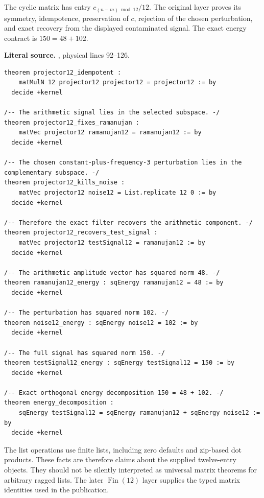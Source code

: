 The cyclic matrix has entry \(c_{(n-m)\bmod12}/12\). The original layer proves
its symmetry, idempotence, preservation of \(c\), rejection of the chosen
perturbation, and exact recovery from the displayed contaminated signal.
The exact energy contract is \(150=48+102\).

\noindent\textbf{Literal source.} \texttt{}, physical lines 92--126.

\begin{Verbatim}[breaklines=true,breakanywhere=true,fontsize=\footnotesize]
theorem projector12_idempotent :
    matMulN 12 projector12 projector12 = projector12 := by
  decide +kernel

/-- The arithmetic signal lies in the selected subspace. -/
theorem projector12_fixes_ramanujan :
    matVec projector12 ramanujan12 = ramanujan12 := by
  decide +kernel

/-- The chosen constant-plus-frequency-3 perturbation lies in the complementary subspace. -/
theorem projector12_kills_noise :
    matVec projector12 noise12 = List.replicate 12 0 := by
  decide +kernel

/-- Therefore the exact filter recovers the arithmetic component. -/
theorem projector12_recovers_test_signal :
    matVec projector12 testSignal12 = ramanujan12 := by
  decide +kernel

/-- The arithmetic amplitude vector has squared norm 48. -/
theorem ramanujan12_energy : sqEnergy ramanujan12 = 48 := by
  decide +kernel

/-- The perturbation has squared norm 102. -/
theorem noise12_energy : sqEnergy noise12 = 102 := by
  decide +kernel

/-- The full signal has squared norm 150. -/
theorem testSignal12_energy : sqEnergy testSignal12 = 150 := by
  decide +kernel

/-- Exact orthogonal energy decomposition 150 = 48 + 102. -/
theorem energy_decomposition :
    sqEnergy testSignal12 = sqEnergy ramanujan12 + sqEnergy noise12 := by
  decide +kernel
\end{Verbatim}

The list operations use finite lists, including zero defaults and zip-based dot
products. These facts are therefore claims about the supplied twelve-entry
objects. They should not be silently interpreted as universal matrix theorems
for arbitrary ragged lists. The later \(\operatorname{Fin}(12)\) layer supplies
the typed matrix identities used in the publication.

